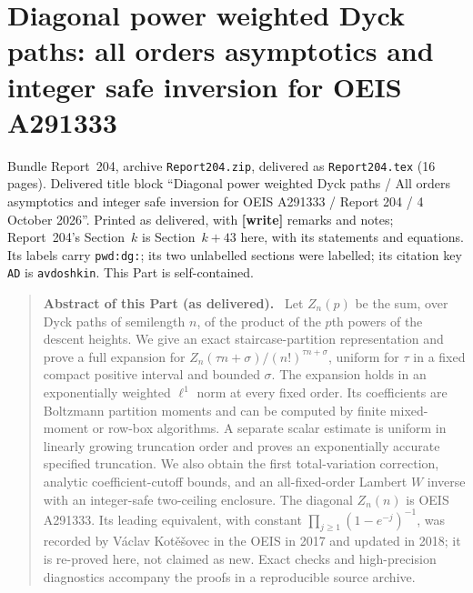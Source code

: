 \documentclass[11pt,letterpaper]{article}
\numberwithin{equation}{section}
\theoremstyle{remark}\newtheorem{remark}[theorem]{Remark}
\newcommand{\file}[1]{\nolinkurl{#1}}
\newenvironment{partabstract}{\begin{quote}\small\noindent\textbf{Abstract of this Part (as delivered).}\ }{\end{quote}}
\newcommand{\partsource}[1]{\par\noindent\begin{minipage}{\textwidth}\small #1\end{minipage}\par\medskip}
\newcounter{pwdsavesec}
\begin{document}
\part{Diagonal power weighted Dyck paths: all orders asymptotics and integer safe inversion for OEIS A291333}\label{pwd:dg:part}
\setcounter{section}{\value{pwdsavesec}}\setlength{\parindent}{17pt}\setlength{\parskip}{0pt plus 1pt}
\partsource{Bundle Report~204, archive \file{Report204.zip}, delivered as \file{Report204.tex} (16 pages). Delivered title block ``Diagonal power weighted Dyck paths / All orders asymptotics and integer safe inversion for OEIS A291333 / Report 204 / 4 October 2026''. Printed as delivered, with \textbf{[write]} remarks and notes; Report~204's Section~$k$ is Section~$k+43$ here, with its statements and equations. Its labels carry \file{pwd:dg:}; its two unlabelled sections were labelled; its citation key \file{AD} is \file{avdoshkin}. This Part is self-contained.}
\begin{partabstract}
Let $Z_n(p)$ be the sum, over Dyck paths of semilength $n$, of the product of the $p$th powers of the descent heights. We give an exact staircase-partition representation and prove a full expansion for $Z_n(\tau n+\sigma)/(n!)^{\tau n+\sigma}$, uniform for $\tau$ in a fixed compact positive interval and bounded $\sigma$. The expansion holds in an exponentially weighted $\ell^1$ norm at every fixed order. Its coefficients are Boltzmann partition moments and can be computed by finite mixed-moment or row-box algorithms. A separate scalar estimate is uniform in linearly growing truncation order and proves an exponentially accurate specified truncation. We also obtain the first total-variation correction, analytic coefficient-cutoff bounds, and an all-fixed-order Lambert $W$ inverse with an integer-safe two-ceiling enclosure. The diagonal $Z_n(n)$ is OEIS A291333. Its leading equivalent, with constant $\prod_{j\ge1}(1-e^{-j})^{-1}$, was recorded by V\'aclav Kot\v e\v sovec in the OEIS in 2017 and updated in 2018; it is re-proved here, not claimed as new. Exact checks and high-precision diagnostics accompany the proofs in a reproducible source archive.
\end{partabstract}
\end{document}
